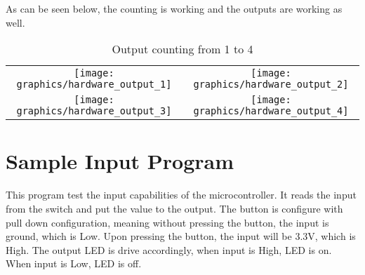 As can be seen below, the counting is working and the outputs are working as well.
\begin{table}
    \center
    \begin{tabular}{cc}
        \texttt{[image: graphics/hardware\_output\_1]} & \texttt{[image: graphics/hardware\_output\_2]} \\
        \texttt{[image: graphics/hardware\_output\_3]} & \texttt{[image: graphics/hardware\_output\_4]} \\
    \end{tabular}
    \caption{Output counting from 1 to 4}
    \label{graphic:output_counting}
\end{table}

\section{Sample Input Program}
This program test the input capabilities of the microcontroller.
It reads the input from the switch and put the value to the output.
The button is configure with pull down configuration, meaning without pressing the button, the input is ground, which is Low.
Upon pressing the button, the input will be 3.3V, which is High.
The output LED is drive accordingly, when input is High, LED is on. When input is Low, LED is off.

